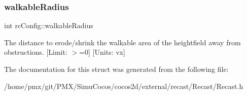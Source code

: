 \subsubsection{\texorpdfstring{walkable\+Radius}{walkableRadius}}
{\footnotesize\ttfamily int rc\+Config\+::walkable\+Radius}

The distance to erode/shrink the walkable area of the heightfield away from obstructions. \mbox{[}Limit\+: $>$=0\mbox{]} \mbox{[}Units\+: vx\mbox{]} 

The documentation for this struct was generated from the following file\+:\begin{DoxyCompactItemize}
\item 
/home/pmx/git/\+P\+M\+X/\+Simu\+Cocos/cocos2d/external/recast/\+Recast/Recast.\+h\end{DoxyCompactItemize}
